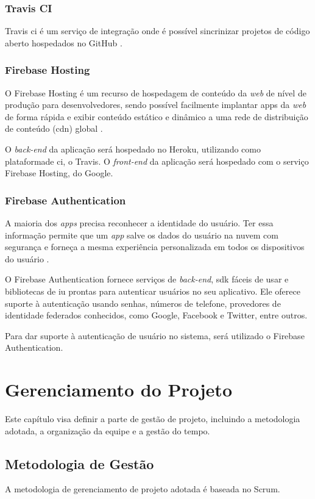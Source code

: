 \documentclass[
    12pt,               %
    openright,          %
    oneside,
    a4paper,            %
    paginasA3,  %
    english,            %
    brazil              %
    ]{ifsp-spo-inf-ctds} %
\begin{document}
\subsection{Travis CI}
Travis \ac{ci} é um serviço de integração onde é possível sincrinizar projetos de código aberto hospedados no GitHub \cite{travis:2021}.

\subsection{Firebase Hosting}
O Firebase Hosting é um recurso de hospedagem de conteúdo da \textit{\gls{web}} de nível de produção para desenvolvedores, sendo possível facilmente implantar apps da \textit{web} de forma rápida e exibir conteúdo estático e dinâmico a uma rede de distribuição de conteúdo (\ac{cdn}) global \cite{hosting:2020}.


O \textit{\gls{back-end}} da aplicação será hospedado no Heroku, utilizando como plataformade \ac{ci}, o Travis. O \textit{\gls{front-end}} da aplicação será hospedado com o serviço Firebase Hosting, do Google.


\subsection{Firebase Authentication}
A maioria dos \textit{\glspl{app}} precisa reconhecer a identidade do usuário. Ter essa informação permite que um \textit{\gls{app}} salve os dados do usuário na nuvem com segurança e forneça a mesma experiência personalizada em todos os dispositivos do usuário \cite{authentication:2020}.


O Firebase Authentication fornece serviços de \textit{\gls{back-end}}, \ac{sdk} fáceis de usar e bibliotecas de \ac{iu} prontas para autenticar usuários no seu aplicativo. Ele oferece suporte à autenticação usando senhas, números de telefone, provedores de identidade federados conhecidos, como Google, Facebook e Twitter, entre outros.


Para dar suporte à autenticação de usuário no sistema, será utilizado o Firebase Authentication.

\chapter{Gerenciamento do Projeto}
Este capítulo visa definir a parte de gestão de projeto, incluindo a metodologia adotada, a organização da equipe e a gestão do tempo.

\section{Metodologia de Gestão}
A metodologia de gerenciamento de projeto adotada é baseada no Scrum.
\end{document}
